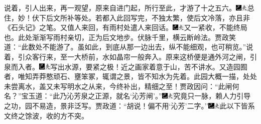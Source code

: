 说着，引人出来，再一观望，原来自进门起，所行至此，才游了十之五六。{\includegraphics[width=3mm]{../Images/00003}\includegraphics[width=3mm]{../Images/00012}\footnotesize \kaishu 总住，妙！伏下后文所补等处。若都入此回写完，不独太繁，使后文冷落，亦且非《石头记》之笔。}又值人来回，有雨村处遣人来回话。{\includegraphics[width=3mm]{../Images/00003}\includegraphics[width=3mm]{../Images/00012}\footnotesize \kaishu 又一紧收，不能终局也。此处渐渐写雨村亲切，正为后文地步。伏脉千里，横云断岭法。}贾政笑道：``此数处不能游了。虽如此，到底从那一边出去，纵不能细观，也可稍览。''说着，引众客行来，至一大桥前，水如晶帘一般奔入。原来这桥便是通外河之闸，引泉而入者。{\includegraphics[width=3mm]{../Images/00003}\includegraphics[width=3mm]{../Images/00012}\footnotesize \kaishu 写出水源，要紧之极！近之画家着意于山，苦不讲水。又造园囿者，唯知弄莽憨顽石、壅笨冢，辄谓之景，皆不知水为先着。此园大概一描，处处未尝离水，盖又未写明水之从来，今终补出，精细之至！}贾政因问：``此闸何名？''宝玉道：``此乃沁芳泉之正源，就名`沁芳闸'。''{\includegraphics[width=3mm]{../Images/00003}\includegraphics[width=3mm]{../Images/00012}\footnotesize \kaishu 究竟只一脉，赖人力引导之功，园不易造，景非泛写。}贾政道：``胡说！偏不用`沁芳'二字。''{\includegraphics[width=3mm]{../Images/00003}\includegraphics[width=3mm]{../Images/00012}\footnotesize \kaishu 此以下皆系文终之馀波，收的方不突。}

